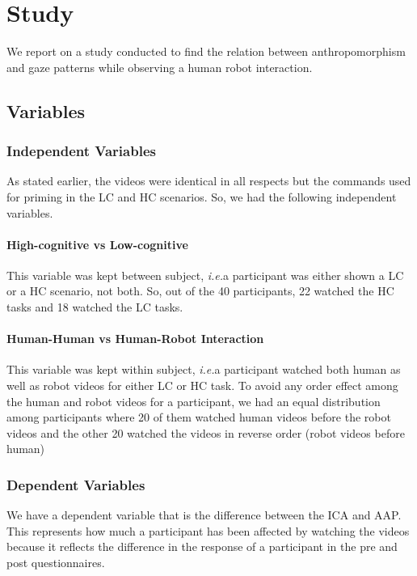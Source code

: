 \documentclass{acm_proc_article-sp}
\newcommand{\ie}{{\textit{i.e.\xspace}}}
\begin{document}
\section{Study}

We report on a study conducted to find the relation between anthropomorphism and
gaze patterns while observing a human robot interaction.

\subsection{Variables}

\subsubsection{Independent Variables}

As stated earlier, the videos were identical in all respects but the commands
used for priming in the LC and HC scenarios. So, we had the following
independent variables.

\paragraph{High-cognitive vs Low-cognitive}

This variable was kept between subject, \ie a participant was either shown a
LC or a HC scenario, not both. So, out of the 40 participants, 22 watched the HC
tasks and 18 watched the LC tasks.

\paragraph{Human-Human vs Human-Robot Interaction}

This variable was kept within subject, \ie a participant watched both
human as well as robot videos for either LC or HC task. To avoid any order
effect among the human and robot videos for a participant, we had an equal
distribution among participants where 20 of them watched human videos before the
robot videos and the other 20 watched the videos in reverse order (robot videos
before human) 

\subsubsection{Dependent Variables}

We have a dependent variable that is the difference between the ICA and AAP.
This represents how much a participant has been affected by watching the videos
because it reflects the difference in the response of a participant in the pre
and post questionnaires.
\end{document}
